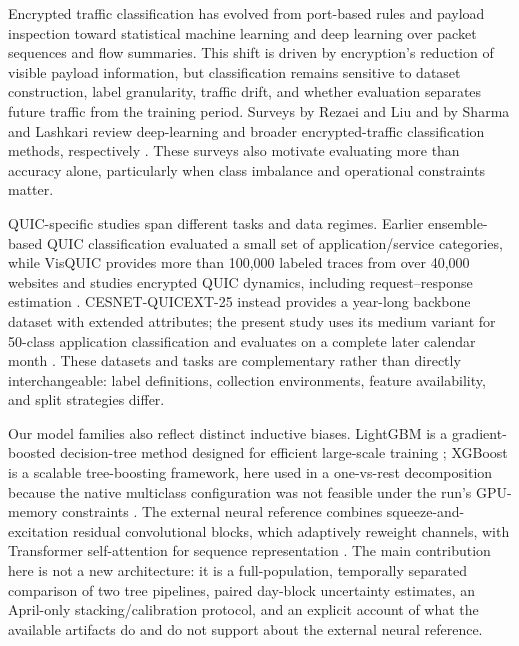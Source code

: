 \documentclass[conference]{IEEEtran}
\begin{document}
Encrypted traffic classification has evolved from port-based rules and payload inspection toward statistical machine learning and deep learning over packet sequences and flow summaries. This shift is driven by encryption's reduction of visible payload information, but classification remains sensitive to dataset construction, label granularity, traffic drift, and whether evaluation separates future traffic from the training period. Surveys by Rezaei and Liu and by Sharma and Lashkari review deep-learning and broader encrypted-traffic classification methods, respectively \cite{rezaei2019,sharma2025survey}. These surveys also motivate evaluating more than accuracy alone, particularly when class imbalance and operational constraints matter.

QUIC-specific studies span different tasks and data regimes. Earlier ensemble-based QUIC classification evaluated a small set of application/service categories, while VisQUIC provides more than 100,000 labeled traces from over 40,000 websites and studies encrypted QUIC dynamics, including request--response estimation \cite{quicensemble2023,visquic2024}. CESNET-QUICEXT-25 instead provides a year-long backbone dataset with extended attributes; the present study uses its medium variant for 50-class application classification and evaluates on a complete later calendar month \cite{cesnet-quicext25,waitingforquic}. These datasets and tasks are complementary rather than directly interchangeable: label definitions, collection environments, feature availability, and split strategies differ.

Our model families also reflect distinct inductive biases. LightGBM is a gradient-boosted decision-tree method designed for efficient large-scale training \cite{lightgbm}; XGBoost is a scalable tree-boosting framework, here used in a one-vs-rest decomposition because the native multiclass configuration was not feasible under the run's GPU-memory constraints \cite{xgboost}. The external neural reference combines squeeze-and-excitation residual convolutional blocks, which adaptively reweight channels, with Transformer self-attention for sequence representation \cite{hu2018senet,vaswani2017attention}. The main contribution here is not a new architecture: it is a full-population, temporally separated comparison of two tree pipelines, paired day-block uncertainty estimates, an April-only stacking/calibration protocol, and an explicit account of what the available artifacts do and do not support about the external neural reference.
\end{document}
